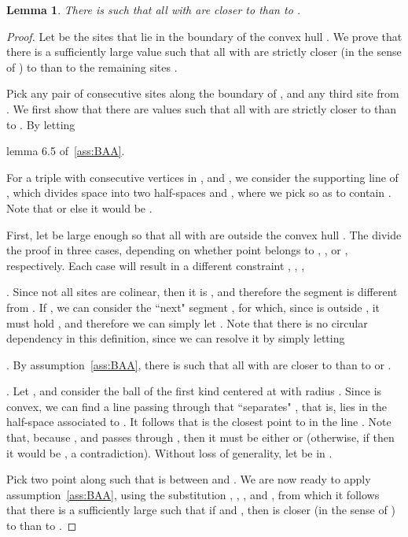 \documentclass[11pt]{article}
\newtheorem{lemma}{Lemma}
\begin{document}
\begin{lemma}\label{lem:VW}
	There is  such that all  with   are closer to  than to . 
\end{lemma}
\begin{proof}


Let  be the sites that lie in the boundary of the convex hull . 
We prove that there is a sufficiently large value  such that all  with 
	are strictly closer (in the sense of ) to  than to the remaining sites . 

Pick any pair of consecutive sites  along the boundary of , and any third site  from . 
We first show that there are values  such that all  with 
	are strictly closer to  than to . 
By letting
	
	lemma 6.5 of~\ref{ass:BAA}. 


For a triple  with  consecutive vertices in , and , 
	we consider the supporting line  of , 
		which divides space into two half-spaces  and , 
	where we pick  so as to contain . 
Note that  or else it would be . 

First, let  be large enough so that all  with  are outside the convex hull . 
The divide the proof in three cases, 
depending on whether 
	point  belongs to , , or , respectively. 
Each case will result in a different constraint , , , 
	
	

\vspace*{0.1in}\noindent{\bf [Case ]}.
Since not all sites are colinear, then it is , and therefore the segment  
	is different from . 
If , 
	we can consider the ``next" segment , 
	for which, since   is outside , it must hold 
	, 
	and therefore we can simply let . 
Note that there is no circular dependency in this definition, since we can resolve it by simply 
	letting 
	
	




\vspace*{0.1in}\noindent{\bf [Case ]}.
By assumption~\ref{ass:BAA}, there is  
	such that all  with  
	are closer to  than to  or .


\vspace*{0.1in}\noindent{\bf [Case ]}.
Let , and consider the ball  of the first kind centered at  with radius . 
Since  is convex, we can find a line  passing through  that ``separates" , 
	that is,  lies in the half-space  associated to . 
It follows that  is the closest point to  in the line . 
Note that, because , and  passes through , 
	then it must be either  or  
	(otherwise, if  then it would be , a contradiction). 
Without loss of generality, let  be in . 

Pick two point  along  such that  is between  and . 
We are now ready to apply assumption~\ref{ass:BAA}, using the substitution
	, , , and , 
	from which it follows that there is a sufficiently large  
		such that if  and , 
		then  is closer (in the sense of ) to  than to . 



\end{proof}
\end{document}
